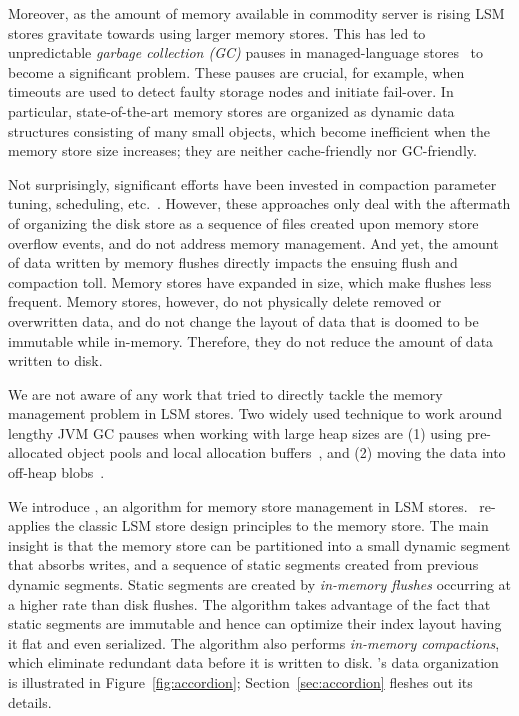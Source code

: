 Moreover, as the amount of memory available in commodity server is rising LSM stores gravitate towards using larger memory stores.
This has led to unpredictable \emph{garbage collection (GC)} pauses in managed-language stores~\cite{cassandra, hbase} to become a significant problem.
These pauses are crucial, for example, when timeouts are used to detect faulty storage nodes and initiate fail-over.
In particular, state-of-the-art memory stores are organized as dynamic data structures consisting of many small objects,
which become inefficient when the memory store size increases; they are neither cache-friendly nor GC-friendly.

Not surprisingly, significant efforts have been invested in compaction parameter tuning, scheduling, etc.~\cite{hbasetuning,
universalcompaction,scylladbcompaction,Sears:2012}. However, these approaches only deal with the aftermath
of organizing the disk store as a sequence of files created upon memory store overflow events, and do not 
address memory management. 
And yet, the amount of data written by memory flushes  
directly impacts the ensuing flush and compaction toll. 
Memory stores have expanded in size, which make flushes less frequent. 
Memory stores, however, do not physically delete removed or overwritten data, and do not change the layout of data that is doomed to be immutable while in-memory.
Therefore, they do not reduce the amount of data written to disk.

We are not aware of any work that tried to directly tackle the memory management problem in LSM stores. 
Two widely used technique to work around lengthy JVM GC pauses when working with large heap sizes are 
(1) using pre-allocated object pools and local allocation buffers~\cite{hbasemslab}, and 
(2) moving the data into off-heap blobs~\cite{cassandraoffheap}. 

We introduce \sys, an algorithm for memory store management in LSM stores. 
\sys\ re-applies the classic LSM store design principles to the memory store. The main insight is that the memory store can be partitioned
 into a small dynamic segment that absorbs writes, and a sequence of static segments created 
 from previous dynamic segments. Static segments are created by \emph{in-memory flushes} occurring at a higher rate
 than disk flushes.  The algorithm takes advantage of the fact that static segments are immutable and hence can optimize their index layout having it flat and even serialized.
 The algorithm also performs \emph{in-memory compactions}, which eliminate redundant %
 data before it is written to disk.
\sys's data organization is illustrated in Figure~\ref{fig:accordion};
 Section~\ref{sec:accordion} fleshes out its details.

